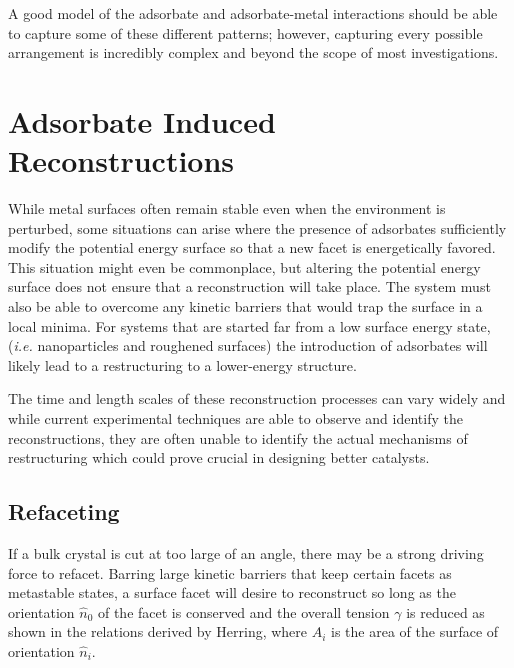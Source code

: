 A good model of the adsorbate and adsorbate-metal interactions should be able
to capture some of these different patterns; however, capturing every possible
arrangement is incredibly complex and beyond the scope of most
investigations.

\section{Adsorbate Induced Reconstructions}

While metal surfaces often remain stable even when the environment is
perturbed, some situations can arise where the presence of adsorbates
sufficiently modify the potential energy surface so that a new facet is
energetically favored. This situation might even be commonplace, but altering
the potential energy surface does not ensure that a reconstruction will take
place. The system must also be able to overcome any kinetic barriers that would
trap the surface in a local minima.  For systems that are started far from a
low surface energy state, ({\em i.e.} nanoparticles and
roughened surfaces) the introduction of adsorbates will likely lead to a
restructuring to a lower-energy structure. 

The time and length scales of these reconstruction processes can vary widely
and while current experimental techniques are able to observe and identify the
reconstructions, they are often unable to identify the actual mechanisms of
restructuring which could prove crucial in designing better catalysts.

\subsection{Refaceting}
If a bulk crystal is cut at too large of an angle, there may be a strong
driving force to refacet. Barring large kinetic barriers that keep certain
facets as metastable states, a surface facet will desire to reconstruct so long as the
orientation $\hat{n}_0$ of the facet is conserved and the overall tension
$\gamma$ is reduced as shown in the relations derived by Herring\citep{Herring:1951ta}, where
$A_i$ is the area of the surface of orientation $\hat{n}_i$.

